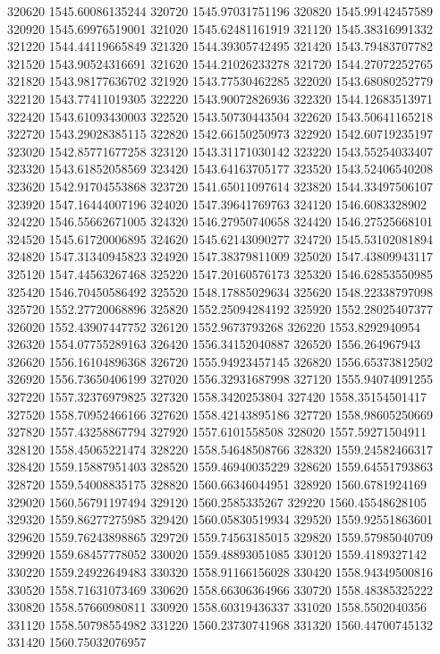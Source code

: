 {320620 1545.60086135244
320720 1545.97031751196
320820 1545.99142457589
320920 1545.69976519001
321020 1545.62481161919
321120 1545.38316991332
321220 1544.44119665849
321320 1544.39305742495
321420 1543.79483707782
321520 1543.90524316691
321620 1544.21026233278
321720 1544.27072252765
321820 1543.98177636702
321920 1543.77530462285
322020 1543.68080252779
322120 1543.77411019305
322220 1543.90072826936
322320 1544.12683513971
322420 1543.61093430003
322520 1543.50730443504
322620 1543.50641165218
322720 1543.29028385115
322820 1542.66150250973
322920 1542.60719235197
323020 1542.85771677258
323120 1543.31171030142
323220 1543.55254033407
323320 1543.61852058569
323420 1543.64163705177
323520 1543.52406540208
323620 1542.91704553868
323720 1541.65011097614
323820 1544.33497506107
323920 1547.16444007196
324020 1547.39641769763
324120 1546.6083328902
324220 1546.55662671005
324320 1546.27950740658
324420 1546.27525668101
324520 1545.61720006895
324620 1545.62143090277
324720 1545.53102081894
324820 1547.31340945823
324920 1547.38379811009
325020 1547.43809943117
325120 1547.44563267468
325220 1547.20160576173
325320 1546.62853550985
325420 1546.70450586492
325520 1548.17885029634
325620 1548.22338797098
325720 1552.27720068896
325820 1552.25094284192
325920 1552.28025407377
326020 1552.43907447752
326120 1552.9673793268
326220 1553.8292940954
326320 1554.07755289163
326420 1556.34152040887
326520 1556.264967943
326620 1556.16104896368
326720 1555.94923457145
326820 1556.65373812502
326920 1556.73650406199
327020 1556.32931687998
327120 1555.94074091255
327220 1557.32376979825
327320 1558.3420253804
327420 1558.35154501417
327520 1558.70952466166
327620 1558.42143895186
327720 1558.98605250669
327820 1557.43258867794
327920 1557.6101558508
328020 1557.59271504911
328120 1558.45065221474
328220 1558.54648508766
328320 1559.24582466317
328420 1559.15887951403
328520 1559.46940035229
328620 1559.64551793863
328720 1559.54008835175
328820 1560.66346044951
328920 1560.6781924169
329020 1560.56791197494
329120 1560.2585335267
329220 1560.45548628105
329320 1559.86277275985
329420 1560.05830519934
329520 1559.92551863601
329620 1559.76243898865
329720 1559.74563185015
329820 1559.57985040709
329920 1559.68457778052
330020 1559.48893051085
330120 1559.4189327142
330220 1559.24922649483
330320 1558.91166156028
330420 1558.94349500816
330520 1558.71631073469
330620 1558.66306364966
330720 1558.48385325222
330820 1558.57660980811
330920 1558.60319436337
331020 1558.5502040356
331120 1558.50798554982
331220 1560.23730741968
331320 1560.44700745132
331420 1560.75032076957
}
